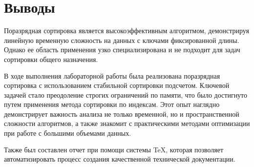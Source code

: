 \section{Выводы}
Поразрядная сортировка является высокоэффективным алгоритмом, демонстрируя линейную временную сложность на данных с ключами фиксированной длины. Однако ее область применения узко специализирована и не подходит для задач сортировки общего назначения.

В ходе выполнения лабораторной работы была реализована поразрядная сортировка с использованием стабильной сортировки подсчетом. Ключевой задачей стало преодоление строгих ограничений по памяти, что было достигнуто путем применения метода сортировки по индексам. Этот опыт наглядно демонстрирует важность анализа не только временной, но и пространственной сложности алгоритмов, а также знакомит с практическими методами оптимизации при работе с большими объемами данных.

Также был составлен отчет при помощи системы \TeX, которая позволяет автоматизировать процесс создания качественной технической документации.
\pagebreak
